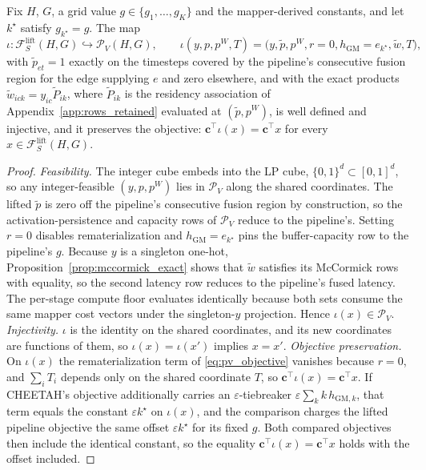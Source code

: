 \begin{theorem}\label{thm:containment}
Fix $H$, $G$, a grid value $g\in\{g_1,\ldots,g_K\}$ and the mapper-derived constants, and let $k^\star$ satisfy $g_{k^\star}=g$.
The map
\begin{equation}
\iota:\mathcal F^{\mathrm{lift}}_S(H,G)\hookrightarrow\mathcal P_V(H,G),\qquad
\iota(y,p,p^W,T)=\bigl(y,\tilde p,p^W,r=0,h_{\mathrm{GM}}=e_{k^\star},\tilde w,T\bigr),
\label{eq:iota}
\end{equation}
with $\tilde p_{et}=1$ exactly on the timesteps covered by the pipeline's consecutive fusion region for the edge supplying $e$ and zero elsewhere, and with the exact products $\tilde w_{ick}=y_{ic}\tilde P_{ik}$, where $\tilde P_{ik}$ is the residency association of Appendix~\ref{app:rows_retained} evaluated at $(\tilde p,p^W)$, is well defined and injective, and it preserves the objective: $\mathbf c^\top\iota(x)=\mathbf c^\top x$ for every $x\in\mathcal F^{\mathrm{lift}}_S(H,G)$.
\end{theorem}
\begin{proof}
\emph{Feasibility.} The integer cube embeds into the LP cube, $\{0,1\}^d\subset[0,1]^d$, so any integer-feasible $(y,p,p^W)$ lies in $\mathcal P_V$ along the shared coordinates.
The lifted $\tilde p$ is zero off the pipeline's consecutive fusion region by construction, so the activation-persistence and capacity rows of $\mathcal P_V$ reduce to the pipeline's.
Setting $r=0$ disables rematerialization and $h_{\mathrm{GM}}=e_{k^\star}$ pins the buffer-capacity row to the pipeline's $g$.
Because $y$ is a singleton one-hot, Proposition~\ref{prop:mccormick_exact} shows that $\tilde w$ satisfies its McCormick rows with equality, so the second latency row reduces to the pipeline's fused latency.
The per-stage compute floor evaluates identically because both sets consume the same mapper cost vectors under the singleton-$y$ projection.
Hence $\iota(x)\in\mathcal P_V$.
\emph{Injectivity.} $\iota$ is the identity on the shared coordinates, and its new coordinates are functions of them, so $\iota(x)=\iota(x')$ implies $x=x'$.
\emph{Objective preservation.} On $\iota(x)$ the rematerialization term of \eqref{eq:pv_objective} vanishes because $r=0$, and $\sum_iT_i$ depends only on the shared coordinate $T$, so $\mathbf c^\top\iota(x)=\mathbf c^\top x$.
If CHEETAH's objective additionally carries an $\varepsilon$-tiebreaker $\varepsilon\sum_kk\,h_{\mathrm{GM},k}$, that term equals the constant $\varepsilon k^\star$ on $\iota(x)$, and the comparison charges the lifted pipeline objective the same offset $\varepsilon k^\star$ for its fixed $g$.
Both compared objectives then include the identical constant, so the equality $\mathbf c^\top\iota(x)=\mathbf c^\top x$ holds with the offset included.
\end{proof}


